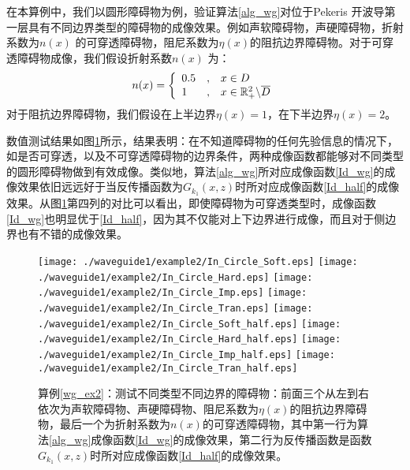 \begin{example}[不同边界类型]\label{wg_ex2}
在本算例中，我们以圆形障碍物为例，验证算法\ref{alg_wg}对位于Pekeris 开波导第一层具有不同边界类型的障碍物的成像效果。例如声软障碍物，声硬障碍物，折射系数为$n(x)$ 的可穿透障碍物，阻尼系数为$\eta(x)$的阻抗边界障碍物。对于可穿透障碍物成像，我们假设折射系数$n(x)$ 为：
\begin{eqnarray*}
n(x)=\left\{
\begin{array}{lll}
  0.5&,&x\in D\\
  1&,&x\in\mathbb{R}_+^2\backslash\overline D
\end{array}
\right.
\end{eqnarray*}
对于阻抗边界障碍物，我们假设在上半边界$\eta(x)=1$，在下半边界$\eta(x)=2$。

数值测试结果如图\ref{fig_wg_ex2}所示，结果表明：在不知道障碍物的任何先验信息的情况下，如是否可穿透，以及不可穿透障碍物的边界条件，两种成像函数都能够对不同类型的圆形障碍物做到有效成像。类似地，算法\ref{alg_wg}所对应成像函数\eqref{Id_wg}的成像效果依旧远远好于当反传播函数为$G_{k_1}(x,z)$时所对应成像函数\eqref{Id_half}的成像效果。从图\ref{fig_wg_ex2}第四列的对比可以看出，即使障碍物为可穿透类型时，成像函数\eqref{Id_wg}也明显优于\eqref{Id_half}，因为其不仅能对上下边界进行成像，而且对于侧边界也有不错的成像效果。
\end{example}
\begin{figure}[htbp]
  \centering
  \texttt{[image: ./waveguide1/example2/In\_Circle\_Soft.eps]}
  \texttt{[image: ./waveguide1/example2/In\_Circle\_Hard.eps]}
  \texttt{[image: ./waveguide1/example2/In\_Circle\_Imp.eps]}
  \texttt{[image: ./waveguide1/example2/In\_Circle\_Tran.eps]}
  \texttt{[image: ./waveguide1/example2/In\_Circle\_Soft\_half.eps]}
  \texttt{[image: ./waveguide1/example2/In\_Circle\_Hard\_half.eps]}
  \texttt{[image: ./waveguide1/example2/In\_Circle\_Imp\_half.eps]}
  \texttt{[image: ./waveguide1/example2/In\_Circle\_Tran\_half.eps]}
  \caption{算例\ref{wg_ex2}：测试不同类型不同边界的障碍物：前面三个从左到右依次为声软障碍物、声硬障碍物、阻尼系数为$\eta(x)$的阻抗边界障碍物，最后一个为折射系数为$n(x)$的可穿透障碍物，其中第一行为算法\ref{alg_wg}成像函数\ref{Id_wg}的成像效果，第二行为反传播函数是函数$G_{k_1}(x,z)$时所对应成像函数\ref{Id_half}的成像效果。}\label{fig_wg_ex2}
\end{figure}


